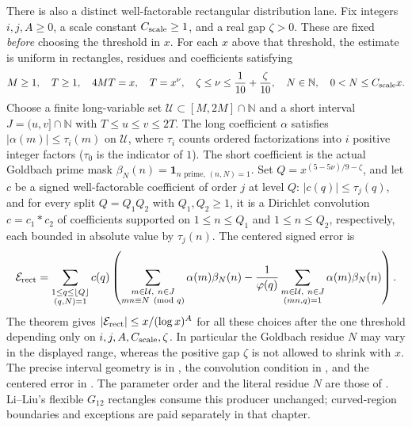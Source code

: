 There is also a distinct well-factorable rectangular distribution lane.
Fix integers $i,j,A\ge0$, a scale constant $C_{\rm scale}\ge1$, and a
real gap $\zeta>0$. These are fixed \emph{before} choosing the threshold
in $x$. For each $x$ above that threshold, the estimate is uniform in
rectangles, residues and coefficients satisfying
\[
 M\ge1,\quad T\ge1,\quad 4MT=x,\quad T=x^\nu,
 \quad \zeta\le\nu\le\frac1{10}+\frac\zeta{10},
 \quad N\in\mathbb N,\quad 0<N\le C_{\rm scale}x.
\]
Choose a finite long-variable set $\mathcal U\subset[M,2M]\cap\mathbb N$
and a short interval $J=(u,v]\cap\mathbb N$ with $T\le u\le v\le2T$.
The long coefficient $\alpha$ satisfies $|\alpha(m)|\le\tau_i(m)$ on
$\mathcal U$, where $\tau_i$ counts ordered factorizations into $i$ positive
integer factors ($\tau_0$ is the indicator of $1$).
The short coefficient is the actual Goldbach prime mask
$\beta_N(n)=\mathbf1_{n\text{ prime},\,(n,N)=1}$.
Set $Q=x^{(5-5\nu)/9-\zeta}$, and let $c$ be a signed well-factorable
coefficient of order $j$ at level $Q$: $|c(q)|\le\tau_j(q)$, and for every
split $Q=Q_1Q_2$ with $Q_1,Q_2\ge1$, it is a Dirichlet convolution
$c=c_1*c_2$ of coefficients supported on $1\le n\le Q_1$ and
$1\le n\le Q_2$, respectively, each bounded in absolute value by $\tau_j(n)$.
The centered signed error is
\[
 \mathcal E_{\rm rect}=
 \sum_{\substack{1\le q\le\lfloor Q\rfloor\\(q,N)=1}}c(q)
 \left(
 \sum_{\substack{m\in\mathcal U,\ n\in J\\mn\equiv N\pmod q}}
       \alpha(m)\beta_N(n)
 -\frac1{\varphi(q)}
 \sum_{\substack{m\in\mathcal U,\ n\in J\\(mn,q)=1}}
       \alpha(m)\beta_N(n)
 \right).
\]
The theorem gives $|\mathcal E_{\rm rect}|\le x/(\log x)^A$ for all these
choices after the one threshold depending only on $i,j,A,C_{\rm scale},\zeta$.
In particular the Goldbach residue $N$ may vary in the displayed range,
whereas the positive gap $\zeta$ is not allowed to shrink with $x$.
The precise interval geometry is in
,
the convolution condition in
,
and the centered error in
.
The parameter order and the literal residue $N$ are those of
.
Li--Liu's flexible $G_{12}$ rectangles consume this producer unchanged;
curved-region boundaries and exceptions are paid separately in that chapter.


